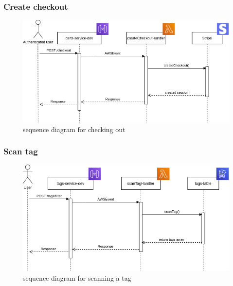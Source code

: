 \subsubsection{Create checkout}
\begin{figure}[!h]
    \vspace{5px}
    \includegraphics[scale=0.5]{../../../../Images/Diagrammi/maintainerManual/createCheckoutSequence.png}
    \centering
    \caption{sequence diagram for checking out} 
\end{figure}
\pagebreak
\subsubsection{Scan tag}
\begin{figure}[!h]
    \vspace{5px}
    \includegraphics[scale=0.5]{../../../../Images/Diagrammi/maintainerManual/scanTagSequence.png}
    \centering
    \caption{sequence diagram for scanning a tag} 
\end{figure}
\pagebreak
